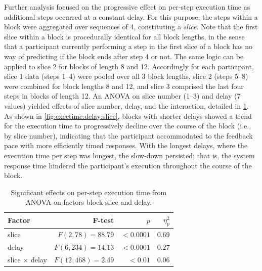 Further analysis focused on the progressive effect on per-step execution time as additional steps occurred at a constant delay.
For this purpose, the steps within a block were aggregated over sequences of 4, constituting a \emph{slice}.
Note that the first slice within a block is procedurally identical for all block lengths, in the sense that a participant currently performing a step in the first slice of a block has no way of predicting if the block ends after step 4 or not.
The same logic can be applied to slice 2 for blocks of length 8 and 12.
Accordingly for each participant, slice 1 data (steps 1--4) were pooled over all 3 block lengths, slice 2 (steps 5--8) were combined for block lengths 8 and 12, and slice 3 comprised the last four steps in blocks of length 12.
An ANOVA on slice number (1--3) and delay (7 values) yielded effects of slice number, delay, and the interaction, detailed in \cref{tab:anova:exectime:slice}.
As shown in \cref{fig:exectime:delay:slice}, blocks with shorter delays showed a trend for the execution time to progressively decline over the course of the block (i.e., by slice number), indicating that the participant accommodated to the feedback pace with more efficiently timed responses.
With the longest delays, where the execution time per step was longest, the slow-down persisted; that is, the system response time hindered the participant's execution throughout the course of the block.

\begin{table}[h]
  \centering
  \caption{Significant effects on per-step execution time from ANOVA on factors block slice and delay.}\label{tab:anova:exectime:slice}
  \setlength{\tabcolsep}{0pt} %
  \begin{tabular*}{\columnwidth}{@{\extracolsep{\fill}\quad}lrrr@{}}
    \toprule
    \textbf{Factor} & \textbf{F-test} & \( p \) & \( \eta^{2}_{p} \) \\
    \midrule
    slice         &   \( F(2, 78) = 88.79 \) &  \( < 0.0001 \) &         \( 0.69 \) \\
    delay         &  \( F(6, 234) = 14.13 \) &  \( < 0.0001 \) &         \( 0.27 \) \\
    slice \( \times \) delay &  \( F(12, 468) = 2.49 \) &    \( < 0.01 \) &         \( 0.06 \) \\
    \bottomrule
  \end{tabular*}%
\end{table}

